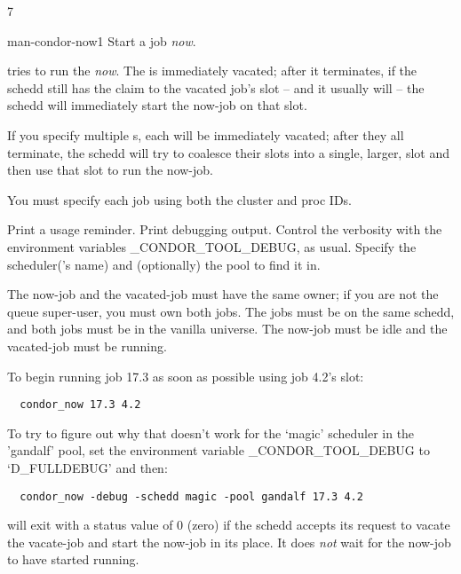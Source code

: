 7\begin{ManPage}{}{man-condor-now}{1}
{Start a job \emph{now}.}

\Synopsis

 

 
	  

\Description

 tries to run the  \emph{now}.  The 
is immediately vacated; after it terminates, if the schedd still has the
claim to the vacated job's slot -- and it usually will -- the schedd will
immediately start the now-job on that slot.

If you specify multiple s, each will be immediately vacated;
after they all terminate, the schedd will try to coalesce their slots into a
single, larger, slot and then use that slot to run the now-job.

You must specify each job using both the cluster and proc IDs.

\begin{Options}
		{Print a usage reminder.}
		{Print debugging output.  Control the verbosity with the environment variables \_CONDOR\_TOOL\_DEBUG, as usual.}
		{Specify the scheduler('s name) and (optionally) the pool to find it in.}
\end{Options}

\GenRem

The now-job and the vacated-job must have the same owner; if you are not
the queue super-user, you must own both jobs.  The jobs must be on the same
schedd, and both jobs must be in the vanilla universe.  The now-job must be
idle and the vacated-job must be running.

\Examples

To begin running job 17.3 as soon as possible using job 4.2's slot:

\begin{verbatim}
  condor_now 17.3 4.2
\end{verbatim}

To try to figure out why that doesn't work for the `magic' scheduler in
the 'gandalf' pool, set the environment variable \_CONDOR\_TOOL\_DEBUG
to `D\_FULLDEBUG' and then:

\begin{verbatim}
  condor_now -debug -schedd magic -pool gandalf 17.3 4.2
\end{verbatim}

\ExitStatus

 will exit with a status value of 0 (zero) if the schedd accepts
its request to vacate the vacate-job and start the now-job in its place.  It
does \emph{not} wait for the now-job to have started running.

\end{ManPage}
